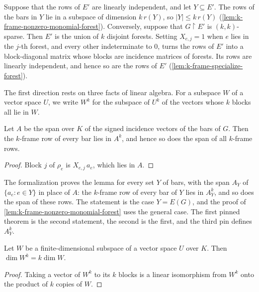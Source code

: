 Suppose that the rows of $E'$ are linearly independent, and let
$Y \subseteq E'$. The rows of the bars in $Y$ lie in a subspace of
dimension $k\, r(Y)$, so $|Y| \le k\, r(Y)$
(\cref{lem:k-frame-nonzero-monomial-forest}). Conversely, suppose that
$G \restriction E'$ is $(k, k)$-sparse. Then $E'$ is the union of $k$
disjoint forests. Setting $X_{e,j} = 1$ when $e$ lies in the $j$-th
forest, and every other indeterminate to $0$, turns the rows of $E'$
into a block-diagonal matrix whose blocks are incidence matrices of
forests. Its rows are linearly independent, and hence so are the rows
of $E'$ (\cref{lem:k-frame-specialize-forest}).

The first direction rests on three facts of linear algebra. For a
subspace $W$ of a vector space $U$, we write $W^k$ for the subspace of
$U^k$ of the vectors whose $k$ blocks all lie in $W$.

\begin{lemma}
  \label{lem:k-frame-span-le-pi}
  \leanok
  Let $A$ be the span over $K$ of the signed incidence vectors of the
  bars of $G$. Then the $k$-frame row of every bar lies in $A^k$, and
  hence so does the span of all $k$-frame rows.
\end{lemma}
\begin{proof}
  \leanok
  Block $j$ of $\rho_e$ is $X_{e,j}\, a_e$, which lies in $A$.
\end{proof}
\begin{fmlnote}
  The formalization proves the lemma for every set $Y$ of bars, with
  the span $A_Y$ of $\{a_e : e \in Y\}$ in place of $A$: the $k$-frame
  row of every bar of $Y$ lies in $A_Y^k$, and so does the span of
  these rows. The statement is the case $Y = E(G)$, and the proof of
  \cref{lem:k-frame-nonzero-monomial-forest} uses the general case. The
  first pinned theorem is the second statement, the second is the first,
  and the third pin defines $A_Y^k$.
\end{fmlnote}

\begin{lemma}
  \label{lem:k-frame-pi-finrank}
  \leanok
  Let $W$ be a finite-dimensional subspace of a vector space $U$ over
  $K$. Then $\dim W^k = k \dim W$.
\end{lemma}
\begin{proof}
  \leanok
  Taking a vector of $W^k$ to its $k$ blocks is a linear isomorphism
  from $W^k$ onto the product of $k$ copies of $W$.
\end{proof}

